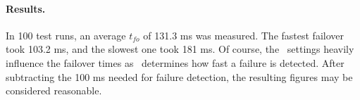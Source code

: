 

\paragraph{Results.} In 100 test runs, an average $t_{fo}$ of 131.3 ms was measured. The fastest failover took 103.2 ms, and the slowest one took 181 ms. Of course, the \liveliness\ settings heavily influence the failover times as \liveliness\ determines how fast a failure is detected. After subtracting the 100 ms needed for failure detection, the resulting figures may be considered reasonable.
%
%
%
%
%
%
%
%
%
%
%
%
%
%
%
%
%
%
%
%
